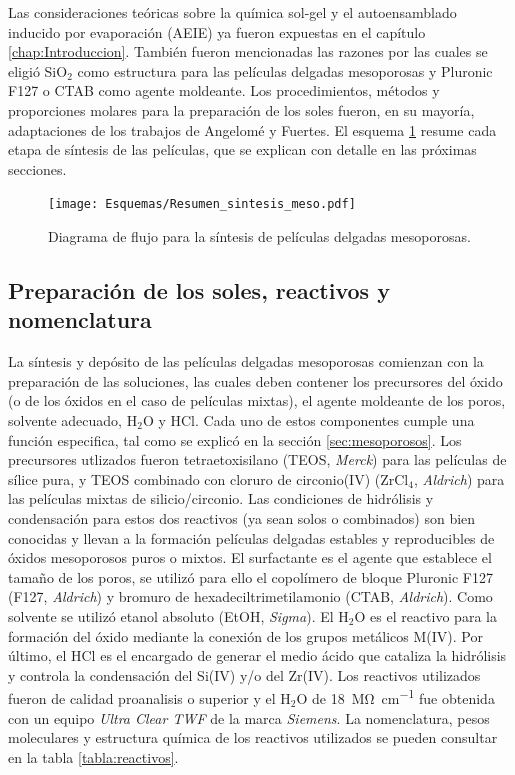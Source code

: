 	 Las consideraciones teóricas sobre la química sol-gel y el autoensamblado inducido por evaporación (AEIE) ya fueron expuestas en el capítulo \ref{chap:Introduccion}. También fueron mencionadas las razones por las cuales se eligió SiO$_2$ como estructura para las películas delgadas mesoporosas y Pluronic F127 o CTAB como agente moldeante. Los procedimientos, métodos y proporciones molares para la preparación de los soles fueron, en su mayoría, adaptaciones de los trabajos de Angelomé\cite{Angelome2008} y Fuertes\cite{Fuertes2009}. El esquema \ref{esq:peliculas_meso} resume cada etapa de síntesis de las películas, que se explican con detalle en las próximas secciones.
		  \begin{figure}[ht]
			  \begin{center}
			  \texttt{[image: Esquemas/Resumen\_sintesis\_meso.pdf]}
			  \caption[Síntesis de películas delgadas mesoporosas]{Diagrama de flujo para la síntesis de películas delgadas mesoporosas.}
			  \label{esq:peliculas_meso}
			  \end{center}
			  \end{figure}
			  \vspace*{-0.2cm}

	\subsection{Preparación de los soles, reactivos y nomenclatura}\label{sec:soles}
		
			La síntesis y depósito de las películas delgadas mesoporosas comienzan con la preparación de las soluciones, las cuales deben contener los precursores del óxido (o de los óxidos en el caso de películas mixtas), el agente moldeante de los poros, solvente adecuado, H$_2$O y HCl\cite{Brinker1990}. Cada uno de estos componentes cumple una función especifica, tal como se explicó en la sección \ref{sec:mesoporosos}. Los precursores utlizados fueron tetraetoxisilano (TEOS, \textit{Merck}) para las películas de sílice pura, y TEOS combinado con cloruro de circonio(IV) (ZrCl$_4$, \textit{Aldrich}) para las películas mixtas de silicio/circonio. Las condiciones de hidrólisis y condensación para estos dos reactivos (ya sean solos o combinados) son bien conocidas y llevan a la formación películas delgadas estables y reproducibles de óxidos mesoporosos puros o mixtos\cite{Soler-Illia2004,Crepaldi2002a,Angelome2008}. El surfactante es el agente que establece el tamaño de los poros, se utilizó para ello el copolímero de bloque Pluronic F127 (F127, \textit{Aldrich}) y bromuro de hexadeciltrimetilamonio (CTAB, \textit{Aldrich}). Como solvente se utilizó etanol absoluto (EtOH, \textit{Sigma}). El H$_2$O es el reactivo para la formación del óxido mediante la conexión de los grupos metálicos M(IV). Por último, el HCl es el encargado de generar el medio ácido que cataliza la hidrólisis y controla la condensación del Si(IV) y/o del Zr(IV). Los reactivos utilizados fueron de calidad proanalisis o superior y el H$_2$O de \SI{18}{\mega\ohm\per\cm} fue obtenida con un equipo \textit{Ultra Clear TWF} de la marca \textit{Siemens}. La nomenclatura, pesos moleculares y estructura química de los reactivos utilizados se pueden consultar en la tabla \ref{tabla:reactivos}.
					
